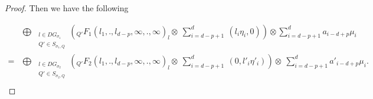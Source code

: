 \documentclass[10pt,a4paper]{amsart}
\begin{document}
\begin{proof}
Then we have the following 

\begin{equation}\label{eqn_Gluing}
\begin{aligned}
&\bigoplus_{\begin{array}{cc}
&  l\in DG_{\sigma_1}\\
& Q'\in S_{\sigma_1,Q}
\end{array}} ({}_{Q'}F_{1}(l_1,.,l_{d-p},\infty,.,\infty)_{l} \otimes\ \sum_{i=d-p+1}^{d}\ (l_i\eta_i,0)) \otimes \sum_{i=d-p+1}^{d}a_{i-d+p}\mu_{i} \\
=&\bigoplus_{{\begin{array}{cc}
     &  l\in DG_{\sigma_2}\\
     & Q'\in S_{\sigma_2,Q}
\end{array}}}({}_{Q'}F_{2}(l_1,.,l_{d-p},\infty,.,\infty)_{l}\otimes\  \sum_{i=d-p+1}^{d} \ (0,l'_i\eta'_i))\otimes\ \sum_{i=d-p+1}^{d}a'_{i-d+p}\mu_{i}.\\ %
\end{aligned}
\end{equation}
\end{proof}
\end{document}
